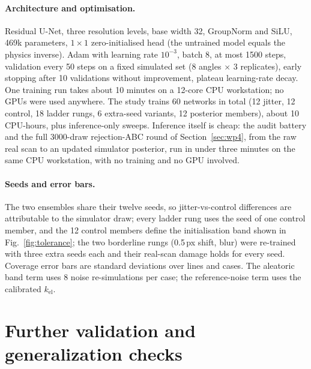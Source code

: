 \documentclass{article}
\begin{document}
\paragraph{Architecture and optimisation.} Residual U-Net, three resolution levels, base width 32, GroupNorm and SiLU, 469k parameters, $1\times1$ zero-initialised head (the untrained model equals the physics inverse). Adam \citep{kingma2015} with learning rate $10^{-3}$, batch 8, at most 1500 steps, validation every 50 steps on a fixed simulated set (8 angles $\times$ 3 replicates), early stopping after 10 validations without improvement, plateau learning-rate decay. One training run takes about 10 minutes on a 12-core CPU workstation; no GPUs were used anywhere. The study trains 60 networks in total (12 jitter, 12 control, 18 ladder rungs, 6 extra-seed variants, 12 posterior members), about 10 CPU-hours, plus inference-only sweeps. Inference itself is cheap: the audit battery and the full 3000-draw rejection-ABC round of Section~\ref{sec:wp4}, from the raw real scan to an updated simulator posterior, run in under three minutes on the same CPU workstation, with no training and no GPU involved.

\paragraph{Seeds and error bars.} The two ensembles share their twelve seeds, so jitter-vs-control differences are attributable to the simulator draw; every ladder rung uses the seed of one control member, and the 12 control members define the initialisation band shown in Fig.~\ref{fig:tolerance}; the two borderline rungs (0.5\,px shift, blur) were re-trained with three extra seeds each and their real-scan damage holds for every seed. Coverage error bars are standard deviations over lines and cases. The aleatoric band term uses 8 noise re-simulations per case; the reference-noise term uses the calibrated $k_{\mathrm{el}}$.

\section{Further validation and generalization checks}
\label{app:further}
\end{document}
